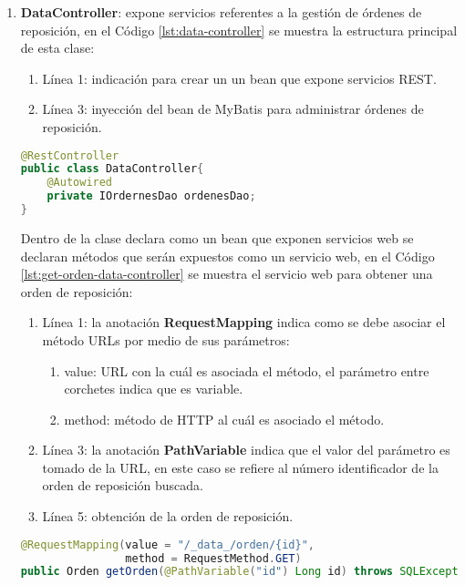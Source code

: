 \begin{enumerate}
	\item \textbf{DataController}: expone servicios referentes a la gestión de órdenes de reposición, en el Código \ref{lst:data-controller} se muestra la estructura principal de esta clase:
	\begin{enumerate}
		\item Línea 1: indicación para crear un un bean que expone servicios REST.
		\item Línea 3: inyección del bean de MyBatis para administrar órdenes de reposición.
	\end{enumerate}

\begin{lstlisting}[language=Java, caption={Controlador para exponer servicios Web de órdenes de reposición.}, captionpos=b, label={lst:data-controller}]
@RestController
public class DataController{
	@Autowired
	private IOrdernesDao ordenesDao;
}
\end{lstlisting}

	Dentro de la clase declara como un bean que exponen servicios web se declaran métodos que serán expuestos como un servicio web, en el Código \ref{lst:get-orden-data-controller} se muestra el servicio web para obtener una orden de reposición:
	\begin{enumerate}
		\item Línea 1: la anotación \textbf{RequestMapping} indica como se debe asociar el método URLs por medio de sus parámetros:
		\begin{enumerate}
			\item value: URL con la cuál es asociada el método, el parámetro entre corchetes indica que es variable.
			\item method: método de HTTP al cuál es asociado el método. 
		\end{enumerate}
		\item Línea 3: la anotación \textbf{PathVariable} indica que el valor del parámetro es tomado de la URL, en este caso se refiere al número identificador de la orden de reposición buscada.
		\item Línea 5: obtención de la orden de reposición.
	\end{enumerate}

\begin{lstlisting}[language=Java, caption={Servicio Web para obtener una orden de reposición.}, captionpos=b, label={lst:get-orden-data-controller}]
@RequestMapping(value = "/_data_/orden/{id}",
				method = RequestMethod.GET)
public Orden getOrden(@PathVariable("id") Long id) throws SQLException{


\end{lstlisting}
\end{enumerate}
